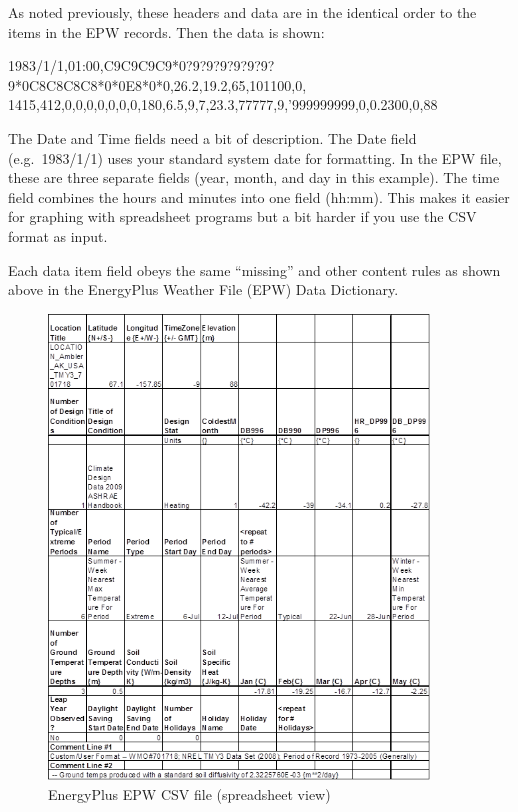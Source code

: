 As noted previously, these headers and data are in the identical order to the items in the EPW records. Then the data is shown:

1983/1/1,01:00,C9C9C9C9*0?9?9?9?9?9?9?9*0C8C8C8C8*0*0E8*0*0,26.2,19.2,65,101100,0, 1415,412,0,0,0,0,0,0,0,180,6.5,9,7,23.3,77777,9,'999999999,0,0.2300,0,88

The Date and Time fields need a bit of description. The Date field (e.g.~1983/1/1) uses your standard system date for formatting. In the EPW file, these are three separate fields (year, month, and day in this example). The time field combines the hours and minutes into one field (hh:mm). This makes it easier for graphing with spreadsheet programs but a bit harder if you use the CSV format as input.

Each data item field obeys the same ``missing'' and other content rules as shown above in the EnergyPlus Weather File (EPW) Data Dictionary.

\begin{figure}[hbtp] %
\centering
\includegraphics[width=0.9\textwidth, height=0.9\textheight, keepaspectratio=true]{media/image015.png}
\caption{EnergyPlus EPW CSV file (spreadsheet view) \protect \label{fig:energyplus-epw-csv-file-spreadsheet-view}}
\end{figure}

